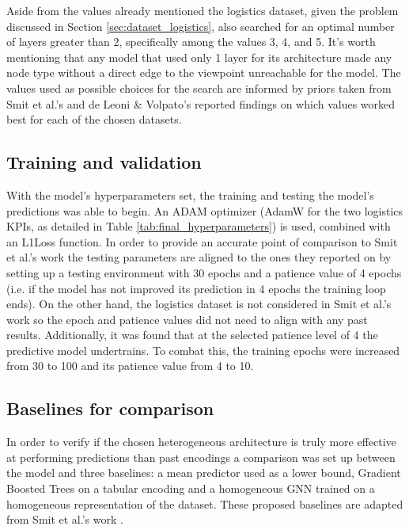         Aside from the values already mentioned the logistics dataset, given the problem discussed in Section \ref{sec:dataset_logistics}, also searched for an optimal number of layers greater than 2, specifically among the values 3, 4, and 5. It's worth mentioning that any model that used only 1 layer for its architecture made any node type without a direct edge to the viewpoint unreachable for the model. The values used as possible choices for the search are informed by priors taken from Smit et al.'s \cite{smit2024} and de Leoni \& Volpato's \cite{deleonieVolpato} reported findings on which values worked best for each of the chosen datasets. 


    \subsection{Training and validation}
        With the model's hyperparameters set, the training and testing the model's predictions was able to begin. An ADAM optimizer (AdamW for the two logistics KPIs, as detailed in Table \ref{tab:final_hyperparameters}) is used, combined with an L1Loss function. In order to provide an accurate point of comparison to Smit et al.'s \cite{smit2024} work the testing parameters are aligned to the ones they reported on by setting up a testing environment with 30 epochs and a patience value of 4 epochs (i.e. if the model has not improved its prediction in 4 epochs the training loop ends). 
        On the other hand, the logistics dataset is not considered in Smit et al.'s work so the epoch and patience values did not need to align with any past results. Additionally, it was found that at the selected patience level of 4 the predictive model undertrains. To combat this, the training epochs were increased from 30 to 100 and its patience value from 4 to 10.

    \subsection{Baselines for comparison}
    \label{sec:models_baselines}
        In order to verify if the chosen heterogeneous architecture is truly more effective at performing predictions than past encodings a comparison was set up between the model and three baselines: a mean predictor used as a lower bound, Gradient Boosted Trees on a tabular encoding and a homogeneous GNN trained on a homogeneous representation of the dataset. These proposed baselines are adapted from Smit et al.'s work \cite{smit2024}.

